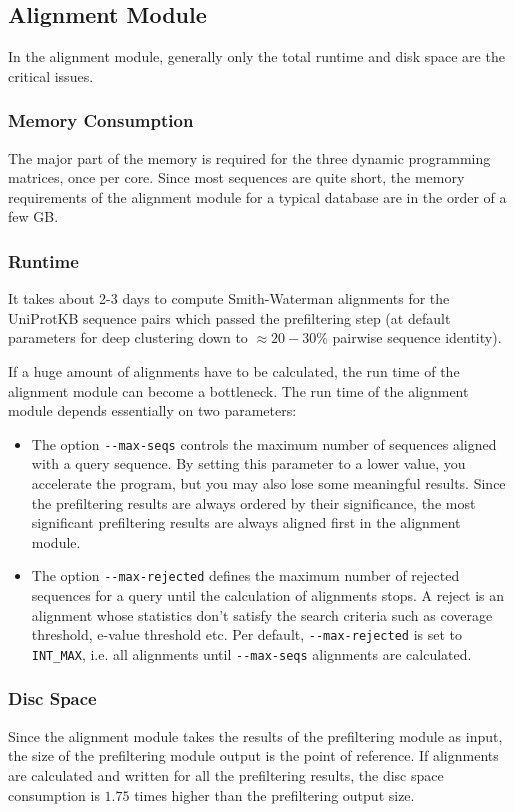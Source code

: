 \documentclass[11pt,a4paper]{scrreprt}
\begin{document}
\subsection{Alignment Module}
In the alignment module, generally only the total runtime and disk space are the critical issues.
\subsubsection{Memory Consumption}
The major part of the memory is required for the three dynamic programming matrices, once per core. Since most sequences are quite short, the memory requirements of the alignment module for a typical database are in the order of a few GB. 
\subsubsection{Runtime}
It takes about 2-3 days to compute Smith-Waterman alignments for the UniProtKB sequence pairs which passed the prefiltering step (at default parameters for deep clustering down to $\approx 20 - 30\%$ pairwise sequence identity).


If a huge amount of alignments have to be calculated, the run time of the alignment module can become a bottleneck. The run time of the alignment module depends essentially on two parameters:
\begin{itemize}
\item The option \texttt{-{}-max-seqs} controls the maximum number of sequences aligned with a query sequence. By setting this parameter to a lower value, you accelerate the program, but you may also lose some meaningful results. Since the prefiltering results are always ordered by their significance, the most significant prefiltering results are always aligned first in the alignment module.
\item The option \texttt{-{}-max-rejected} defines the maximum number of rejected sequences for a query until the calculation of alignments stops. A reject is an alignment whose statistics don't satisfy the search criteria such as coverage threshold, e-value threshold etc. Per default, \texttt{-{}-max-rejected} is set to \texttt{INT\_MAX}, i.e. all alignments until \texttt{-{}-max-seqs} alignments are calculated.
\end{itemize}
\subsubsection{Disc Space}
Since the alignment module takes the results of the prefiltering module as input, the size of the prefiltering module output is the point of reference. If alignments are calculated and written for all the prefiltering results, the disc space consumption is $1.75$ times higher than the prefiltering output size.
\end{document}
